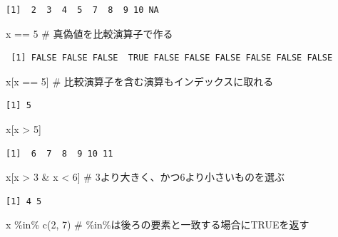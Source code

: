 \documentclass[
  letterpaper,
  DIV=11,
  numbers=noendperiod]{scrreprt}
\newenvironment{Shaded}{\begin{snugshade}}{\end{snugshade}}
\newcommand{\CommentTok}[1]{\textcolor[rgb]{0.37,0.37,0.37}{#1}}
\newcommand{\DecValTok}[1]{\textcolor[rgb]{0.68,0.00,0.00}{#1}}
\newcommand{\FunctionTok}[1]{\textcolor[rgb]{0.28,0.35,0.67}{#1}}
\newcommand{\NormalTok}[1]{\textcolor[rgb]{0.00,0.23,0.31}{#1}}
\newcommand{\SpecialCharTok}[1]{\textcolor[rgb]{0.37,0.37,0.37}{#1}}
\begin{document}
\begin{verbatim}
[1]  2  3  4  5  7  8  9 10 NA
\end{verbatim}

\begin{Shaded}
\begin{Highlighting}[]
\NormalTok{x }\SpecialCharTok{==} \DecValTok{5} \CommentTok{\# 真偽値を比較演算子で作る}
\end{Highlighting}
\end{Shaded}

\begin{verbatim}
 [1] FALSE FALSE FALSE  TRUE FALSE FALSE FALSE FALSE FALSE FALSE
\end{verbatim}

\begin{Shaded}
\begin{Highlighting}[]
\NormalTok{x[x }\SpecialCharTok{==} \DecValTok{5}\NormalTok{] }\CommentTok{\# 比較演算子を含む演算もインデックスに取れる}
\end{Highlighting}
\end{Shaded}

\begin{verbatim}
[1] 5
\end{verbatim}

\begin{Shaded}
\begin{Highlighting}[]
\NormalTok{x[x }\SpecialCharTok{\textgreater{}} \DecValTok{5}\NormalTok{]}
\end{Highlighting}
\end{Shaded}

\begin{verbatim}
[1]  6  7  8  9 10 11
\end{verbatim}

\begin{Shaded}
\begin{Highlighting}[]
\NormalTok{x[x }\SpecialCharTok{\textgreater{}} \DecValTok{3} \SpecialCharTok{\&}\NormalTok{ x }\SpecialCharTok{\textless{}} \DecValTok{6}\NormalTok{] }\CommentTok{\# 3より大きく、かつ6より小さいものを選ぶ}
\end{Highlighting}
\end{Shaded}

\begin{verbatim}
[1] 4 5
\end{verbatim}

\begin{Shaded}
\begin{Highlighting}[]
\NormalTok{x }\SpecialCharTok{\%in\%} \FunctionTok{c}\NormalTok{(}\DecValTok{2}\NormalTok{, }\DecValTok{7}\NormalTok{) }\CommentTok{\# \%in\%は後ろの要素と一致する場合にTRUEを返す}
\end{Highlighting}
\end{Shaded}
\end{document}
